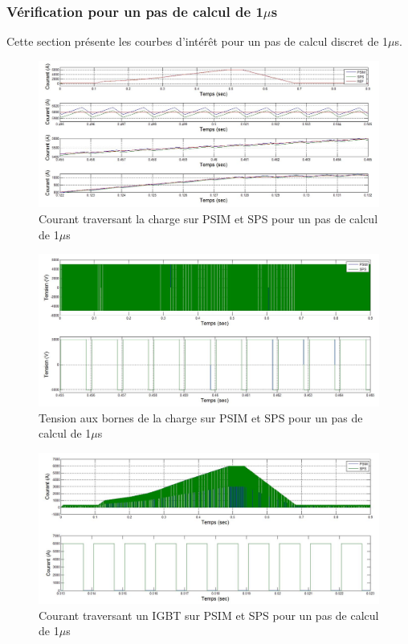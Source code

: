 \documentclass[11pt,letterpaper,final]{report}
\begin{document}
\clearpage
\subsubsection{Vérification pour un pas de calcul de 1$\mu$s}
Cette section présente les courbes d'intérêt pour un pas de calcul discret de 1$\mu$s.


\begin{figure}[htb]
\centering
\includegraphics[scale=0.5]{Fig/Hacheur4Quadrants/HacheurCourantCharge1u.jpg}
\caption{Courant traversant la charge sur PSIM et SPS pour un pas de calcul de 1$\mu$s}
\label{hc_cou_ch_1}
\end{figure}


\begin{figure}[htb]
\centering
\includegraphics[scale=0.5]{Fig/Hacheur4Quadrants/HacheurTensionCharge1u.jpg}
\caption{Tension aux bornes de la charge sur PSIM et SPS pour un pas de calcul de 1$\mu$s}
\label{hc_ten_ch_1}
\end{figure}


\begin{figure}[htb]
\centering
\includegraphics[scale=0.5]{Fig/Hacheur4Quadrants/HacheurCourantIGBT1u.jpg}
\caption{Courant traversant un IGBT sur PSIM et SPS pour un pas de calcul de 1$\mu$s}
\label{hc_IG_cou_1}
\end{figure}
\end{document}
